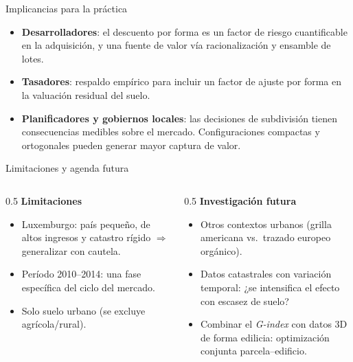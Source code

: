\documentclass[11pt,aspectratio=169]{beamer}
\newcommand{\Gindex}{\textit{G-index}\xspace}
\begin{document}
\begin{frame}{Implicancias para la práctica}
  \begin{itemize}
    \item \textbf{Desarrolladores}: el descuento por forma es un factor de riesgo cuantificable en la adquisición, y una fuente de valor vía racionalización y ensamble de lotes.
    \item \textbf{Tasadores}: respaldo empírico para incluir un \alert{factor de ajuste por forma} en la valuación residual del suelo.
    \item \textbf{Planificadores y gobiernos locales}: las decisiones de subdivisión tienen consecuencias medibles sobre el mercado. Configuraciones compactas y ortogonales pueden generar mayor captura de valor.
  \end{itemize}
\end{frame}

\begin{frame}{Limitaciones y agenda futura}
  \begin{columns}[T]
    \begin{column}{0.5\textwidth}
      \textbf{Limitaciones}
      \begin{itemize}\small
        \item Luxemburgo: país pequeño, de altos ingresos y catastro rígido $\Rightarrow$ generalizar con cautela.
        \item Período 2010--2014: una fase específica del ciclo del mercado.
        \item Solo suelo urbano (se excluye agrícola/rural).
      \end{itemize}
    \end{column}
    \begin{column}{0.5\textwidth}
      \textbf{Investigación futura}
      \begin{itemize}\small
        \item Otros contextos urbanos (grilla americana vs.\ trazado europeo orgánico).
        \item Datos catastrales con variación temporal: ¿se intensifica el efecto con escasez de suelo?
        \item Combinar el \Gindex con datos 3D de forma edilicia: optimización conjunta parcela--edificio.
      \end{itemize}
    \end{column}
  \end{columns}
\end{frame}
\end{document}
